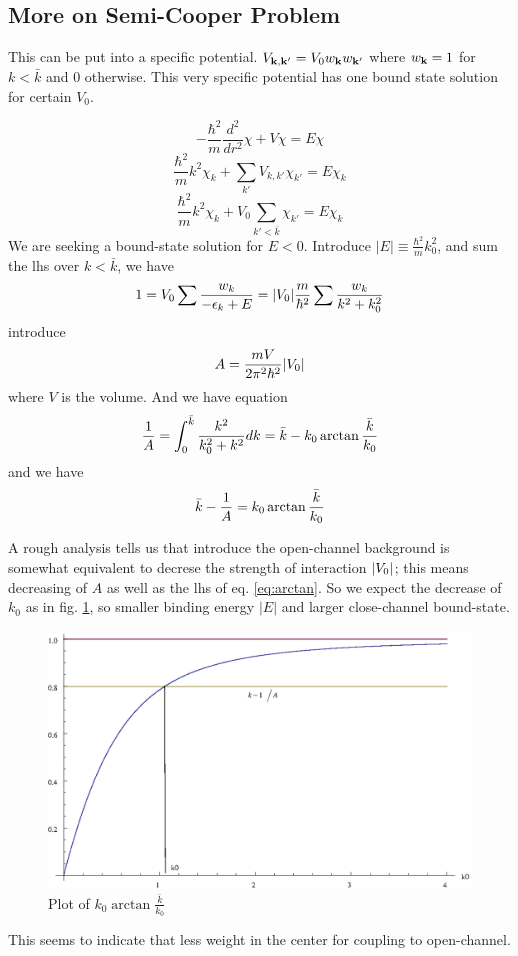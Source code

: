 \subsection{More on Semi-Cooper Problem}
This can be put into a specific potential. $V_{\mathbf{k},\mathbf{k}'}=V_0w_{\mathbf{k}}{}w_{\mathbf{k}'}$ where $w_{\mathbf{k}}=1$ for $k<\bar{k}$ and 0 otherwise. This very specific potential has one bound state solution for certain $V_0$.  

\begin{equation*}
-\frac{\hbar^2}{m}\frac{d^2}{dr^2}\chi+V\chi=E\chi
\end{equation*}
\begin{equation*}
\frac{\hbar^2}{m}k^2\chi_k+\sum_{k'}V_{k,k'}\chi_{k'}=E\chi_k
\end{equation*}
\begin{equation*}
\frac{\hbar^2}{m}k^2\chi_k+V_0\sum_{k'<\bar{k}}\chi_{k'}=E\chi_k
\end{equation*}
We are seeking a bound-state solution for $E<0$.  Introduce $|E|\equiv\frac{\hbar^2}{m}k_0^2$, and sum the lhs over $k<\bar{k}$, we have 
\[
1=V_0\sum\frac{w_k}{-\epsilon_k+E}=\lvert{V_0}\rvert\frac{m}{\hbar^2}\sum\frac{w_k}{k^2+k_0^2}
\]
introduce 
\begin{equation}
A=\frac{mV}{2\pi^2\hbar^2}\lvert{V_0}\rvert
\end{equation}
where $V$ is the volume. And we have equation
\begin{equation}\label{eq:boundCooper}
\frac{1}{A}=\int^{\bar{k}}_0\frac{k^2}{k_0^2+k^2}dk=\bar{k}-k_0\arctan\frac{\bar{k}}{k_0}
\end{equation}
and we have 
\begin{equation}\label{eq:arctan}
\bar{k}-\frac{1}{A}=k_0\arctan\frac{\bar{k}}{k_0}
\end{equation}

A rough analysis tells us that introduce the open-channel background is somewhat equivalent to decrese the strength of interaction $\lvert{V_0}\rvert$; this means decreasing of $A$ as well as the lhs of eq. \eqref{eq:arctan}. So we expect the decrease of $k_0$ as in fig. \ref{fig:arctan}, so smaller binding energy $|E|$ and larger close-channel bound-state. 
\begin{figure}[htb]
	\centering
		\includegraphics[width=.50\textwidth]{image/arctan.eps}
	\caption{Plot of $k_0\arctan\frac{\bar{k}}{k_0}$\label{fig:arctan}}
\end{figure}
This seems to indicate that less weight in the center for coupling to open-channel.  


